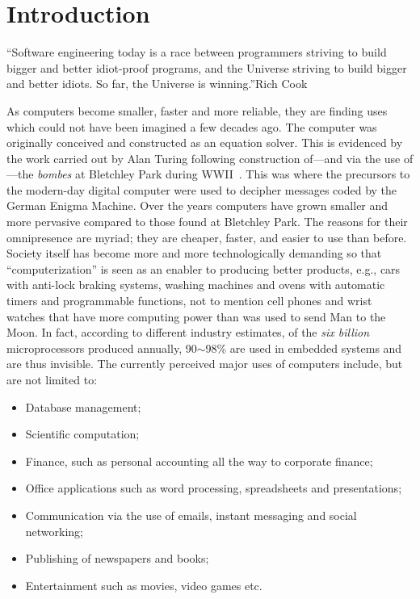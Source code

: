 \chapter{Introduction}{``Software engineering today is a race between
  programmers striving to build bigger and better idiot-proof
  programs, and the Universe striving to build bigger and better
  idiots. So far, the Universe is winning.''}{Rich Cook}

As computers become smaller, faster and more reliable, they are
finding uses which could not have been imagined a few decades ago. The
computer was originally conceived and constructed as an equation
solver. This is evidenced by the work carried out by Alan Turing
following construction of---and via the use of---the \emph{bombes} at
Bletchley Park during WWII~\cite{codebook}. This was where the
precursors to the modern-day digital computer were used to decipher
messages coded by the German Enigma Machine. Over the years computers
have grown smaller and more pervasive compared to those found at
Bletchley Park. The reasons for their omnipresence are myriad; they
are cheaper, faster, and easier to use than before. Society itself has
become more and more technologically demanding so that
``computerization'' is seen as an enabler to producing better
products, e.g., cars with anti-lock braking systems, washing machines
and ovens with automatic timers and programmable functions, not to
mention cell phones and wrist watches that have more computing power
than was used to send Man to the Moon. In fact, according to different
industry estimates, of the \emph{six billion} microprocessors produced
annually, 90$\sim$98\% are used in embedded systems and are thus
invisible. The currently perceived major uses of computers include,
but are not limited to:\\

\begin{itemize}
\item{Database management;}
\item{Scientific computation;}
\item{Finance, such as personal accounting all the way to corporate
  finance;}
\item{Office applications such as word processing, spreadsheets and
  presentations;}
\item{Communication via the use of emails, instant messaging and
  social networking;}
\item{Publishing of newspapers and books;}
\item{Entertainment such as movies, video games etc.}
\end{itemize}

